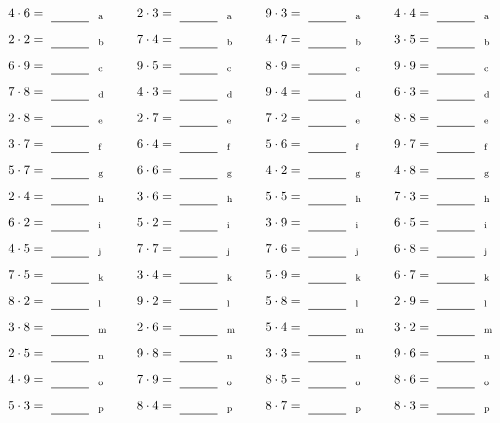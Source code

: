\documentclass
[
  draft    = true,
  fontsize = 11pt,
  parskip  = half-
]
{scrartcl}
\begin{document}
\par\vfill\par
\begin{align*}
    \pline{4\cdot6}&=\rline{a}
  & \pline{2\cdot3}&=\rline{a}
  & \pline{9\cdot3}&=\rline{a}
  & \pline{4\cdot4}&=\rline{a} \\[1ex]
    \pline{2\cdot2}&=\rline{b}
  & \pline{7\cdot4}&=\rline{b}
  & \pline{4\cdot7}&=\rline{b}
  & \pline{3\cdot5}&=\rline{b} \\[1ex]
    \pline{6\cdot9}&=\rline{c}
  & \pline{9\cdot5}&=\rline{c}
  & \pline{8\cdot9}&=\rline{c}
  & \pline{9\cdot9}&=\rline{c} \\[1ex]
    \pline{7\cdot8}&=\rline{d}
  & \pline{4\cdot3}&=\rline{d}
  & \pline{9\cdot4}&=\rline{d}
  & \pline{6\cdot3}&=\rline{d} \\[1ex]
    \pline{2\cdot8}&=\rline{e}
  & \pline{2\cdot7}&=\rline{e}
  & \pline{7\cdot2}&=\rline{e}
  & \pline{8\cdot8}&=\rline{e} \\[1ex]
    \pline{3\cdot7}&=\rline{f}
  & \pline{6\cdot4}&=\rline{f}
  & \pline{5\cdot6}&=\rline{f}
  & \pline{9\cdot7}&=\rline{f} \\[1ex]
    \pline{5\cdot7}&=\rline{g}
  & \pline{6\cdot6}&=\rline{g}
  & \pline{4\cdot2}&=\rline{g}
  & \pline{4\cdot8}&=\rline{g} \\[1ex]
    \pline{2\cdot4}&=\rline{h}
  & \pline{3\cdot6}&=\rline{h}
  & \pline{5\cdot5}&=\rline{h}
  & \pline{7\cdot3}&=\rline{h} \\[1ex]
    \pline{6\cdot2}&=\rline{i}
  & \pline{5\cdot2}&=\rline{i}
  & \pline{3\cdot9}&=\rline{i}
  & \pline{6\cdot5}&=\rline{i} \\[1ex]
    \pline{4\cdot5}&=\rline{j}
  & \pline{7\cdot7}&=\rline{j}
  & \pline{7\cdot6}&=\rline{j}
  & \pline{6\cdot8}&=\rline{j} \\[1ex]
    \pline{7\cdot5}&=\rline{k}
  & \pline{3\cdot4}&=\rline{k}
  & \pline{5\cdot9}&=\rline{k}
  & \pline{6\cdot7}&=\rline{k} \\[1ex]
    \pline{8\cdot2}&=\rline{l}
  & \pline{9\cdot2}&=\rline{l}
  & \pline{5\cdot8}&=\rline{l}
  & \pline{2\cdot9}&=\rline{l} \\[1ex]
    \pline{3\cdot8}&=\rline{m}
  & \pline{2\cdot6}&=\rline{m}
  & \pline{5\cdot4}&=\rline{m}
  & \pline{3\cdot2}&=\rline{m} \\[1ex]
    \pline{2\cdot5}&=\rline{n}
  & \pline{9\cdot8}&=\rline{n}
  & \pline{3\cdot3}&=\rline{n}
  & \pline{9\cdot6}&=\rline{n} \\[1ex]
    \pline{4\cdot9}&=\rline{o}
  & \pline{7\cdot9}&=\rline{o}
  & \pline{8\cdot5}&=\rline{o}
  & \pline{8\cdot6}&=\rline{o} \\[1ex]
    \pline{5\cdot3}&=\rline{p}
  & \pline{8\cdot4}&=\rline{p}
  & \pline{8\cdot7}&=\rline{p}
  & \pline{8\cdot3}&=\rline{p}
\end{align*}
\end{document}
